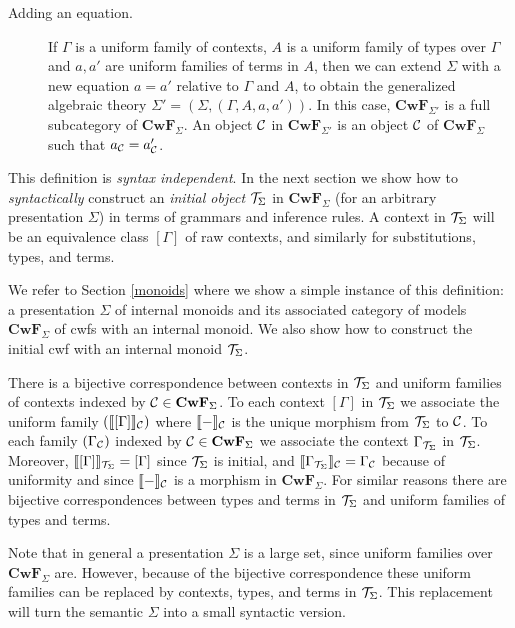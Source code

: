\documentclass{mscs}
\newcommand{\FYI}[1]{{#1}}
\def\Cwf{\mathbf{CwF}}
\begin{document}
\begin{definition}
\begin{description}
\item[Adding an equation.]
  If $\Gamma$ is a uniform family of contexts,
  $A$ is a uniform family of types over $\Gamma$
  and $a,a'$ are uniform families of terms in $A$,
  then we can extend $\Sigma$ with a new equation $a = a'$ relative to $\Gamma$ and $A$, to obtain
  the generalized algebraic theory $\Sigma' = (\Sigma,(\Gamma,A,a,a'))$.
  In this case,
  $\Cwf_{\Sigma'}$ is a full subcategory of $\Cwf_{\Sigma}$. An object ${\mathcal C}$ in
  $\Cwf_{\Sigma'}$ is an object ${\mathcal C}$ of $\Cwf_\Sigma$ such that $a_{{\mathcal C}} = a'_{{\mathcal C}}$.
\end{description}

\end{definition}

This definition is {\em syntax independent}. In the next section we show how to {\em syntactically} construct an {\em initial object} ${\mathcal T}_{\Sigma}$ in $\Cwf_{\Sigma}$ (for an arbitrary \FYI{presentation} $\Sigma$) in terms of grammars and inference rules. A context in ${\mathcal T}_{\Sigma}$ will be an equivalence class $[ \Gamma ]$ of raw contexts, and similarly for substitutions, types, and terms.

We refer to Section \ref{monoids} where we show a simple instance of this definition: a \FYI{presentation} $\Sigma$ of internal monoids and its associated category of models $\Cwf_\Sigma$ of cwfs with an internal monoid. We also show how to construct the initial cwf with an internal monoid ${\mathcal T}_\Sigma$.

\begin{remark}
There is a bijective correspondence between contexts in ${\mathcal T}_\Sigma$ and uniform families of contexts
indexed by $\C \in \Cwf_\Sigma$. To each context $[ \Gamma ]$ in ${\mathcal T}_\Sigma$ we associate the uniform family $(\llbracket  [ \Gamma ]  \rrbracket_{\mathcal C})$ where $\llbracket - \rrbracket_{\mathcal C}$ is the unique morphism from ${\mathcal T}_\Sigma$ to ${\mathcal C}$. To each family $(\Gamma_{\mathcal C})$ indexed by $\C \in \Cwf_\Sigma$ we associate the context $\Gamma_{{\mathcal T}_\Sigma}$ in ${\mathcal T}_\Sigma$. Moreover, $\llbracket  [ \Gamma ]  \rrbracket_{{\mathcal T}_\Sigma} = [ \Gamma ]$ since ${\mathcal T}_\Sigma$ is initial, and  $\llbracket  {\Gamma_{{\mathcal T}_\Sigma}} \rrbracket_{\mathcal C}  = \Gamma_{\mathcal C}$ because of uniformity and since $\llbracket - \rrbracket_{\mathcal C}$ is a morphism in $\Cwf_{\Sigma}$. For similar reasons there are bijective correspondences between types and terms in ${\mathcal T}_\Sigma$ and uniform families of types and terms.
\end{remark}

\begin{remark}
Note that in general a \FYI{presentation} $\Sigma$ is a large set, since uniform families over $\Cwf_\Sigma$ are. However, because of the bijective correspondence these uniform families can be replaced by contexts, types, and terms in ${\mathcal T}_\Sigma$. This replacement will turn the semantic $\Sigma$ into a small syntactic version.
\end{remark}
\end{document}
